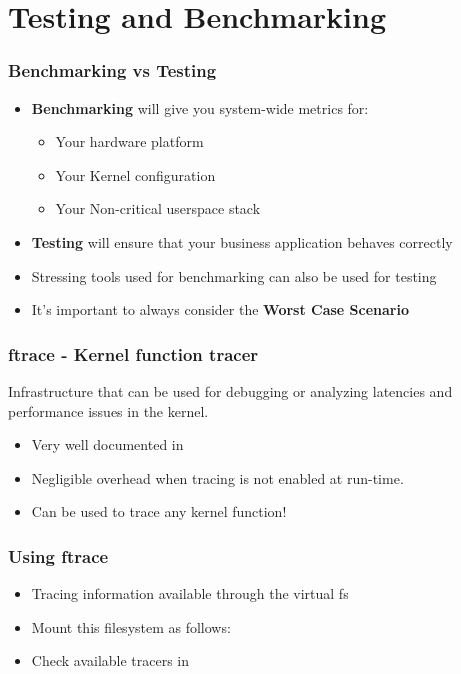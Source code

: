 \section{Testing and Benchmarking}

\begin{frame}
	\frametitle{Benchmarking vs Testing}
	\begin{itemize}
		\item \textbf{Benchmarking} will give you system-wide metrics for:
			\begin{itemize}
				\item Your hardware platform
				\item Your Kernel configuration
				\item Your Non-critical userspace stack
			\end{itemize}
		\item \textbf{Testing} will ensure that your business application behaves correctly
		\item Stressing tools used for benchmarking can also be used for testing
		\item It's important to always consider the \textbf{Worst Case Scenario}
	\end{itemize}
\end{frame}

\begin{frame}
  \frametitle{ftrace - Kernel function tracer}

  Infrastructure that can be used for debugging or analyzing latencies
  and performance issues in the kernel.

  \begin{itemize}
  \item Very well documented in 
  \item Negligible overhead when tracing is not enabled at run-time.
  \item Can be used to trace any kernel function!
  \end{itemize}
\end{frame}

\begin{frame}
  \frametitle{Using ftrace}
  \begin{itemize}
  \item Tracing information available through the  virtual fs
  \item Mount this filesystem as follows:\\
  \item Check available tracers in
  \end{itemize}
\end{frame}

